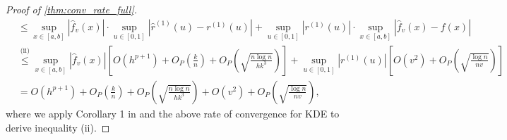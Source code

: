 \documentclass{uwstat572}
\theoremstyle{definition}
\renewcommand{\hat}{\widehat}
\theoremstyle{theorem}
\begin{document}
\begin{proof}[Proof of \autoref{thm:conv_rate_full}]
\begin{align*}
&\leq \sup_{x\in [a,b]}\left|\hat{f}_v(x)\right| \cdot \sup_{u\in [0,1]}\left|\hat{r}^{(1)}(u) -r^{(1)}(u) \right| + \sup_{u\in [0,1]}\left|r^{(1)}(u)\right|\cdot \sup_{x\in [a,b]}\left|\hat{f}_v(x) -f(x)\right|\\
& \stackrel{\text{(ii)}}{\leq} \sup_{x\in [a,b]} \left|\hat{f}_v(x)\right| \left[O(h^{p+1}) + O_P\left(\frac{k}{n}\right) +O_P\left(\sqrt{\frac{n\log n}{hk^3}}\right)\right] + \sup_{u\in [0,1]}\left|r^{(1)}(u)\right| \left[O(v^2) + O_P\left(\sqrt{\frac{\log n}{nv}}\right)\right]\\
&= O(h^{p+1}) + O_P\left(\frac{k}{n}\right) +O_P\left(\sqrt{\frac{n\log n}{hk^3}}\right) + O(v^2) + O_P\left(\sqrt{\frac{\log n}{nv}}\right),
\end{align*}
where we apply Corollary 1 in \cite{francisco2003uniform} and the above rate of convergence for KDE to derive inequality (ii).


\end{proof}
\end{document}
